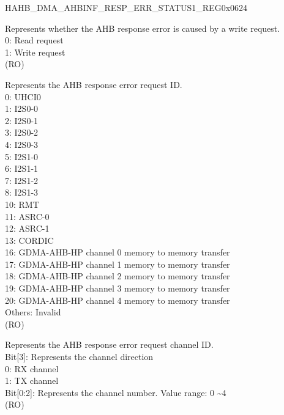 \begin{register}{H}{AHB\_DMA\_AHBINF\_RESP\_ERR\_STATUS1\_REG}{0x0624}\label{regdesc:AHBDMAAHBINFRESPERRSTATUS1REG}
%
%
%
%
\regnewline%
\begin{regdesc}\begin{reglist}
\label{fielddesc:AHBDMAAHBINFRESPERRWR}\item [AHB\_DMA\_AHBINF\_RESP\_ERR\_WR] Represents whether the AHB response error is caused by a write request.\\0: Read request\\1: Write request\\ (RO)
\label{fielddesc:AHBDMAAHBINFRESPERRID}\item [AHB\_DMA\_AHBINF\_RESP\_ERR\_ID] Represents the AHB response error request ID.\\
0: UHCI0\\
1: I2S0-0\\
2: I2S0-1\\
3: I2S0-2\\
4: I2S0-3\\
5: I2S1-0\\
6: I2S1-1\\
7: I2S1-2\\
8: I2S1-3\\
10: RMT\\
11: ASRC-0\\
12: ASRC-1\\
13: CORDIC\\
16: GDMA-AHB-HP channel 0 memory to memory transfer\\
17: GDMA-AHB-HP channel 1 memory to memory transfer\\
18: GDMA-AHB-HP channel 2 memory to memory transfer\\
19: GDMA-AHB-HP channel 3 memory to memory transfer\\
20: GDMA-AHB-HP channel 4 memory to memory transfer\\
Others: Invalid\\ (RO)
\label{fielddesc:AHBDMAAHBINFRESPERRCHID}\item [AHB\_DMA\_AHBINF\_RESP\_ERR\_CH\_ID] Represents the AHB response error request channel ID.\\
Bit[3]: Represents the channel direction\\
0: RX channel\\
1: TX channel\\
Bit[0:2]: Represents the channel number. Value range: 0 \textasciitilde 4\\ (RO)
\end{reglist}\end{regdesc}
\end{register}


